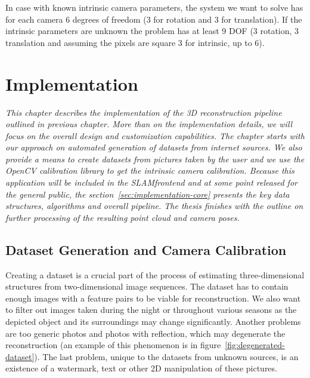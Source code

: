 In case with known intrinsic camera parameters, the system we want to solve has for each camera 6 degrees of freedom (3 for rotation and 3 for translation). If the intrinsic parameters are unknown the problem has at least 9 DOF (3 rotation, 3 translation and assuming the pixels are square 3 for intrinsic, up to 6).

\chapter{Implementation}
\label{chapter:implementation}
\textit{This chapter describes the implementation of the 3D reconstruction pipeline outlined in previous chapter. More than on the implementation details, we will focus on the overall design and customization capabilities. The chapter starts with our approach on automated generation of datasets from internet sources. We also provide a means to create datasets from pictures taken by the user and we use the OpenCV calibration library to get the intrinsic camera calibration. Because this application will be included in the SLAM\textunderscore frontend and at some point released for the general public, the section~\ref{sec:implementation-core} presents the key data structures, algorithms and overall pipeline. The thesis finishes with the outline on further processing of the resulting point cloud and camera poses.}

\section{Dataset Generation and Camera Calibration}
\label{sec:camera_calib}
Creating a dataset is a crucial part of the process of estimating three-dimensional structures from two-dimensional image sequences. The dataset has to contain enough images with a feature pairs to be viable for reconstruction. We also want to filter out images taken during the night or throughout various seasons as the depicted object and its surroundings may change significantly. Another problems are too generic photos and photos with reflection, which may degenerate the reconstruction (an example of this phenomenon is in figure~\ref{fig:degenerated-dataset}). The last problem, unique to the datasets from unknown sources, is an existence of a watermark, text or other 2D manipulation of these pictures.

